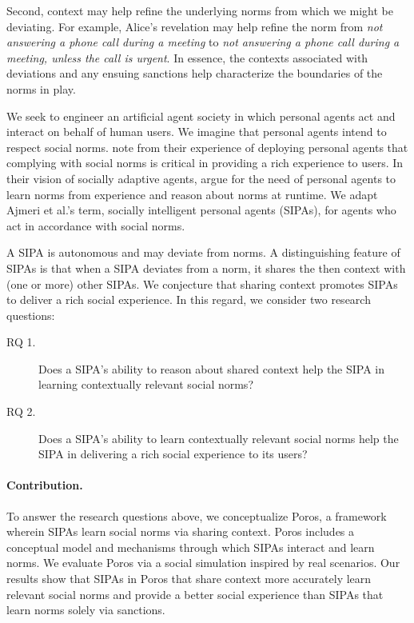 \documentclass[11pt,          %
               phd,           %
               onehalfspacing %
               ]{ncsuthesis}
\makeatletter
\newcommand{\etal}{{et al.\@\xspace}}
\newcommand{\fsl}{\textsl}
\newcommand{\frameworkB}{Poros\xspace}
\newcommand{\nsa}[1]{\textcolor{green!50!black}{NSA:~~#1}}
\newcommand{\mps}[1]{\textcolor{blue}{MPS:~~#1}}
\newcommand{\hg}[1]{\textcolor{blue!50!black}{HG:~~#1}}
\makeatother
\begin{document}
Second, context may help refine the underlying norms from which we might
be deviating. For example, Alice's revelation may help refine the norm
from \fsl{not answering a phone call during a meeting} to \fsl{not
answering a phone call during a meeting, unless the call is urgent}. In
essence, the contexts associated with deviations and any ensuing
sanctions help characterize the boundaries of the norms in play.

We seek to engineer an artificial agent society in which personal agents
\citep{Murukannaiah-AAMAS14-Xipho} act and interact on behalf of human
users. We imagine that personal agents intend to respect social norms.
\citet{tambe2008electric} note from their experience
of deploying personal agents that complying with social norms is
critical in providing a rich experience to users. In their vision of
socially adaptive agents, 
 argue for the need of personal
agents to learn norms from experience and reason about norms at runtime.
We adapt Ajmeri {\etal}'s \citeyearpar{Ajmeri-AAMAS17-Arnor} term,
socially intelligent personal agents (SIPAs), for agents who act in accordance
with social norms.

A SIPA is autonomous and may deviate from norms. A distinguishing
feature of SIPAs is that when a SIPA deviates from a norm, it shares the
then context with (one or more) other
SIPAs. We conjecture that sharing context promotes SIPAs to deliver a
rich social experience. In this regard, we consider two research
questions:

\begin{description}
\item[RQ 1.] Does a SIPA's ability to reason about shared context 
  help the SIPA in learning contextually relevant social norms? 


\item[RQ 2.] Does a SIPA's ability to learn contextually relevant
  social norms help the SIPA in delivering a rich social experience to
  its users? 
\end{description}

\paragraph{Contribution.}
To answer the research questions above, we conceptualize \frameworkB, a
framework wherein SIPAs learn social norms via sharing context.
\frameworkB includes a conceptual model and mechanisms through which
SIPAs interact and learn norms. We evaluate \frameworkB via
a social simulation inspired by real scenarios. Our results show that SIPAs in \frameworkB that
share context more accurately learn relevant social norms and provide a
better social experience than SIPAs that learn norms solely via
sanctions.
\end{document}
